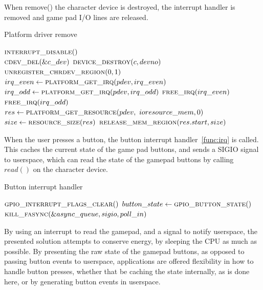 When remove() the character device is destroyed, the interrupt handler is
removed and game pad I/O lines are released.
 
\begin{algorithm}[H]
  \footnotesize
  \caption{Platform driver remove}
  \begin{algorithmic}[1]
      \State $\Call{interrupt\_disable}{\null}$ \\
      \State $\Call{cdev\_del}{\&c\_dev}$
      \State $\Call{device\_destroy}{c, devno}$
      \State $\Call{unregister\_chrdev\_region}{0, 1}$ \\

      \State $irq\_even \gets \Call{platform\_get\_irq}{pdev, irq\_even}$
      \State $irq\_odd \gets \Call{platform\_get\_irq}{pdev, irq\_odd}$
      \State $\Call{free\_irq}{irq\_even}$
      \State $\Call{free\_irq}{irq\_odd}$ \\

      \State $res \gets \Call{platform\_get\_resource}{pdev, \
        ioresource\_mem, 0}$
      \State $size \gets \Call{resource\_size}{res}$
      \State $\Call{release\_mem\_region}{res.start, size}$
    \EndFunction
  \end{algorithmic}
  \label{func:remove}
\end{algorithm}

When the user presses a button, the button interrupt handler~\ref{func:irq} is
called. This caches the current state of the game pad buttons, and sends a SIGIO
signal to userspace, which can read the state of the gamepad buttons by calling
$read()$ on the character device.

\begin{algorithm}
  \footnotesize
  \caption{Button interrupt handler}
  \begin{algorithmic}[1]
      \State $\Call{gpio\_interrupt\_flags\_clear}{\null}$
      \State $button\_state \gets \Call{gpio\_button\_state}{\null}$
      \If {$async\_queue$}
        \State $\Call{kill\_fasync}{\&async\_queue, sigio, poll\_in}$
      \EndIf
    \EndFunction
  \end{algorithmic}
  \label{func:irq}
\end{algorithm}

By using an interrupt to read the gamepad, and a signal to notify userspace,
the presented solution attempts to conserve energy, by sleeping the CPU as much
as possible. By presenting the raw state of the gamepad buttons, as opposed to
passing button events to userspace, applications are offered flexibility in how
to handle button presses, whether that be caching the state internally, as is
done here, or by generating button events in userspace.

